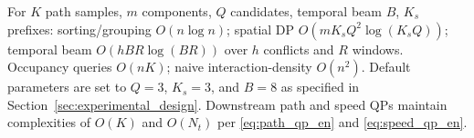 For $K$ path samples, $m$ components, $Q$ candidates, temporal beam $B$, $K_s$ prefixes: sorting/grouping $O(n\log n)$; spatial DP $O(mK_sQ^2\log(K_sQ))$; temporal beam $O(hBR\log(BR))$ over $h$ conflicts and $R$ windows. Occupancy queries $O(nK)$; naive interaction-density $O(n^2)$. Default parameters are set to $Q=3$, $K_s=3$, and $B=8$ as specified in Section~\ref{sec:experimental_design}. Downstream path and speed QPs maintain complexities of $O(K)$ and $O(N_t)$ per \eqref{eq:path_qp_en} and \eqref{eq:speed_qp_en}.
